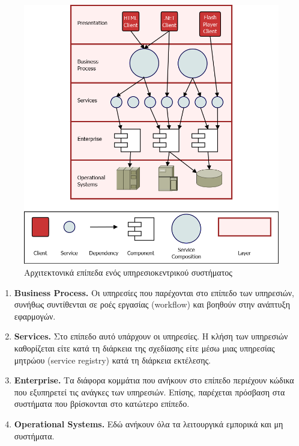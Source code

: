 \begin{figure}[htbp]
  \begin{center}
    \includegraphics[scale=0.3]{Figures/SOA/SOA_layers.png}
  \end{center}
  \caption{Αρχιτεκτονικά επίπεδα ενός υπηρεσιοκεντρικού συστήματος}
  \label{fig:SOA_layers}
\end{figure}

\begin{enumerate}
\setcounter{enumi}{\thenumberedCntF}
\item \textbf{Business Process.} Οι υπηρεσίες που παρέχονται στο 
επίπεδο των υπηρεσιών, συνήθως συντίθενται σε ροές εργασίας (workflow) 
και βοηθούν στην ανάπτυξη εφαρμογών.
\item \textbf{Services.} Στο επίπεδο αυτό υπάρχουν οι υπηρεσίες. Η 
κλήση των υπηρεσιών καθορίζεται είτε κατά τη διάρκεια της σχεδίασης είτε 
μέσω μιας υπηρεσίας μητρώου (service registry) κατά τη διάρκεια 
εκτέλεσης.
\item \textbf{Enterprise.} Τα διάφορα κομμάτια που ανήκουν στο επίπεδο 
περιέχουν κώδικα που εξυπηρετεί τις ανάγκες των υπηρεσιών. Επίσης, 
παρέχεται πρόσβαση στα συστήματα που βρίσκονται στο κατώτερο επίπεδο.
\item \textbf{Operational Systems.} Εδώ ανήκουν όλα τα λειτουργικά 
εμπορικά και μη συστήματα.
\setcounter{numberedCntF}{\theenumi}
\end{enumerate}

